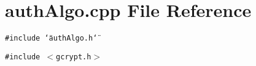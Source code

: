 \section{auth\-Algo.cpp File Reference}
\label{authAlgo_8cpp}
{\tt \#include \char`\"{}auth\-Algo.h\char`\"{}}\par
{\tt \#include $<$gcrypt.h$>$}\par
